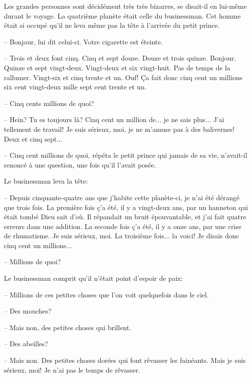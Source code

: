 \documentclass[a4paper]{report}
\begin{document}
Les grandes personnes sont décidément très très bizarres, se disait-il en lui-même durant le voyage.
\parachapter{} %
La quatrième planète était celle du businessman. Cet homme était si occupé qu'il ne leva même pas la tête à l'arrivée du petit prince.

-- Bonjour, lui dit celui-ci. Votre cigarette est éteinte.

-- Trois et deux font cinq. Cinq et sept douze. Douze et trois quinze. Bonjour. Quinze et sept vingt-deux. Vingt-deux et six vingt-huit. Pas de temps de la rallumer. Vingt-six et cinq trente et un. Ouf! Ça fait donc cinq cent un millions six cent vingt-deux mille sept cent trente et un.


-- Cinq cents millions de quoi?

-- Hein? Tu es toujours là? Cinq cent un million de... je ne sais plus... J'ai tellement de travail! Je suis sérieux, moi, je ne m'amuse pas à des balivernes! Deux et cinq sept...

-- Cinq cent millions de quoi, répéta le petit prince qui jamais de sa vie, n'avait-il renoncé à une question, une fois qu'il l'avait posée.

Le businessman leva la tête:

-- Depuis cinquante-quatre ans que j'habite cette planète-ci, je n'ai été dérangé que trois fois. La première fois ç'a été, il y a vingt-deux ans, par un hanneton qui était tombé Dieu sait d'où. Il répandait un bruit épouvantable, et j'ai fait quatre erreurs dans une addition. La seconde fois ç'a été, il y a onze ans, par une crise de rhumatisme. Je suis sérieux, moi. La troisième fois... la voici! Je disais donc cinq cent un millions...

-- Millions de quoi?

Le businessman comprit qu'il n'était point d'espoir de paix:

-- Millions de ces petites choses que l'on voit quelquefois dans le ciel.

-- Des mouches?

-- Mais non, des petites choses qui brillent.

-- Des abeilles?

-- Mais non. Des petites choses dorées qui font rêvasser les fainéants. Mais je suis sérieux, moi! Je n'ai pas le temps de rêvasser.
\end{document}
